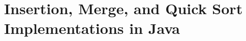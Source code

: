 \documentclass{article}
\begin{document}
\section{Insertion, Merge, and Quick Sort Implementations in Java}


\end{document}
